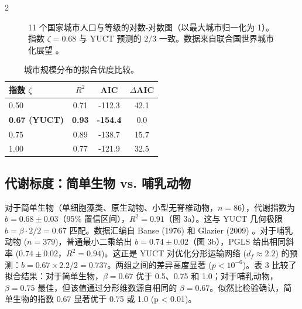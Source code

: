 \documentclass[11pt,a4paper]{article}
\newcommand{\betaf}{\beta}
\newcommand{\df}{d_f}
\begin{document}
\begin{multicols}{2}
		\begin{figure}[htbp]
			\centering
			\caption{11 个国家城市人口与等级的对数-对数图（以最大城市归一化为 1）。指数 \(\zeta = 0.68\) 与 YUCT 预测的 \(2/3\) 一致。数据来自联合国世界城市化展望 \cite{UN2018}。}
			\label{fig:cities}
		\end{figure}
		
		\begin{table}[htbp]
			\centering
			\caption{城市规模分布的拟合优度比较。}
			\label{tab:comparison_cities}
			\begin{tabular}{lccc}
				\toprule
				\textbf{指数 \(\zeta\)} & \(R^2\) & AIC & \(\Delta\)AIC \\
				\midrule
				0.50 & 0.71 & -112.3 & 42.1 \\
				\textbf{0.67 (YUCT)} & \textbf{0.93} & \textbf{-154.4} & 0.0 \\
				0.75 & 0.89 & -138.7 & 15.7 \\
				1.00 & 0.77 & -121.9 & 32.5 \\
				\bottomrule
			\end{tabular}
		\end{table}
		
		\subsection{代谢标度：简单生物 vs. 哺乳动物}
		
		对于简单生物（单细胞藻类、原生动物、小型无脊椎动物，\(n = 86\)），代谢指数为 \(b = 0.68 \pm 0.03\)（95\% 置信区间），\(R^2 = 0.91\)（图 3a）。这与 YUCT 几何极限 \(b = \betaf \cdot 2/2 = 0.67\) 匹配。数据汇编自 Banse (1976) \cite{Banse1976} 和 Glazier (2009) \cite{Glazier2009}。对于哺乳动物 (\(n = 379\))，普通最小二乘给出 \(b = 0.74 \pm 0.02\)（图 3b），PGLS 给出相同斜率 (\(0.74 \pm 0.02\)，\(R^2 = 0.94\))。这正是 YUCT 对优化分形运输网络 (\(\df \approx 2.2\)) 的预测：\(b = 0.67 \times 2.2 / 2 = 0.737\)。两组之间的差异高度显著 (\(p < 10^{-6}\))。表 3 比较了拟合结果：对于简单生物，\(\beta = 0.67\) 优于 0.5、0.75 和 1.0；对于哺乳动物，\(\beta = 0.75\) 最佳，但该值通过分形维数源自相同的 \(\beta = 0.67\)。似然比检验确认，简单生物的指数 0.67 显著优于 0.75 或 1.0 (p < 0.01)。
		

\end{multicols}
\end{document}
